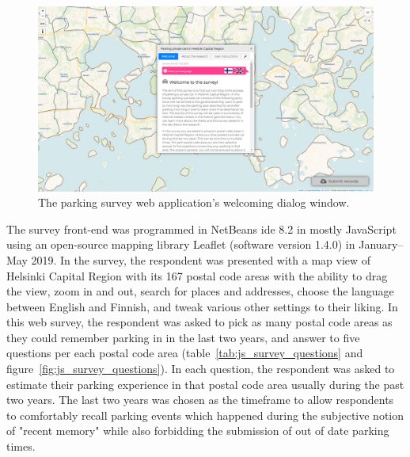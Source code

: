 \begin{figure}[H]%
    \includegraphics[width=\textwidth]{images/js_survey_welcome.png}
    \caption[Survey application landing page]{The parking survey web application's welcoming dialog window.}%
    \label{fig:js_survey_welcome}%
\end{figure}

The survey front-end was programmed in NetBeans \gls{ide} 8.2 in mostly JavaScript using an open-source mapping library Leaflet (software version 1.4.0) in January--May 2019. In the survey, the respondent was presented with a map view of Helsinki Capital Region with its 167 postal code areas with the ability to drag the view, zoom in and out, search for places and addresses, choose the language between English and Finnish, and tweak various other settings to their liking. In this web survey, the respondent was asked to pick as many postal code areas as they could remember parking in in the last two years, and answer to five questions per each postal code area (table~\ref{tab:js_survey_questions} and figure~\ref{fig:js_survey_questions}). In each question, the respondent was asked to estimate their parking experience in that postal code area usually during the past two years. The last two years was chosen as the timeframe to allow respondents to comfortably recall parking events which happened during the subjective notion of "recent memory" while also forbidding the submission of out of date parking times. 

